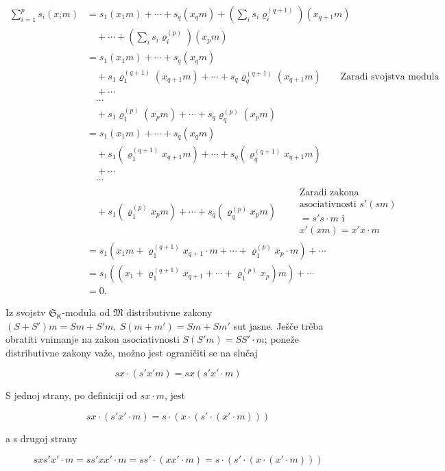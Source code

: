 \documentclass[11pt]{article}
\begin{document}
\[
\begin{aligned}
\sum_{i=1}^{p}s_i(x_i m)
&=s_1(x_1m)+\cdots+s_q(x_qm)
  +\left(\sum_i s_i\varrho_i^{(q+1)}\right)(x_{q+1}m)\\
&\quad+\cdots+\left(\sum_i s_i\varrho_i^{(p)}\right)(x_pm)\\
&=s_1(x_1m)+\cdots+s_q(x_qm)\\
&\quad+s_1\varrho_1^{(q+1)}(x_{q+1}m)+\cdots+s_q\varrho_q^{(q+1)}(x_{q+1}m)
  \qquad\text{Zaradi svojstva modula}\\
&\quad+\cdots\\
&\quad\cdots\\
&\quad+s_1\varrho_1^{(p)}(x_pm)+\cdots+s_q\varrho_q^{(p)}(x_pm)\\
&=s_1(x_1m)+\cdots+s_q(x_qm)\\
&\quad+s_1(\varrho_1^{(q+1)}x_{q+1}m)+\cdots+s_q(\varrho_q^{(q+1)}x_{q+1}m)\\
&\quad+\cdots\\
&\quad\cdots\\
&\quad+s_1(\varrho_1^{(p)}x_pm)+\cdots+s_q(\varrho_q^{(p)}x_pm)
  \qquad\begin{gathered}\text{Zaradi zakona}\\ \text{asociativnosti }s'(sm)\\ =s's\cdot m\text{ i}\\ x'(xm)=x'x\cdot m\end{gathered}\\
&=s_1\left(x_1m+\varrho_1^{(q+1)}x_{q+1}\cdot m+\cdots+\varrho_1^{(p)}x_p\cdot m\right)+\cdots\\
&=s_1\left(\left(x_1+\varrho_1^{(q+1)}x_{q+1}+\cdots+\varrho_1^{(p)}x_p\right)m\right)+\cdots\\
&=0.
\end{aligned}
\]


Iz svojstv \(\mathfrak S_{\mathsf K}\)-modula od \(\mathfrak M\) distributivne zakony \((S+S')m=Sm+S'm,\ S(m+m')=Sm+Sm'\) sut jasne. Ješče trěba obratiti vnimanje na zakon asociativnosti \(S(S'm)=SS'\cdot m\); poneže distributivne zakony važe, možno jest ograničiti se na slučaj

\[
sx\cdot(s'x' m)=sx(s'x'\cdot m)
\]

S jednoj strany, po definiciji od \(sx\cdot m\), jest

\[
sx\cdot(s'x'\cdot m)=s\cdot(x\cdot(s'\cdot(x'\cdot m)))
\]

a s drugoj strany

\[
sx s'x'\cdot m=ss'xx'\cdot m=ss'\cdot(xx'\cdot m)
=s\cdot(s'\cdot(x\cdot(x'\cdot m)))
\]
\end{document}
